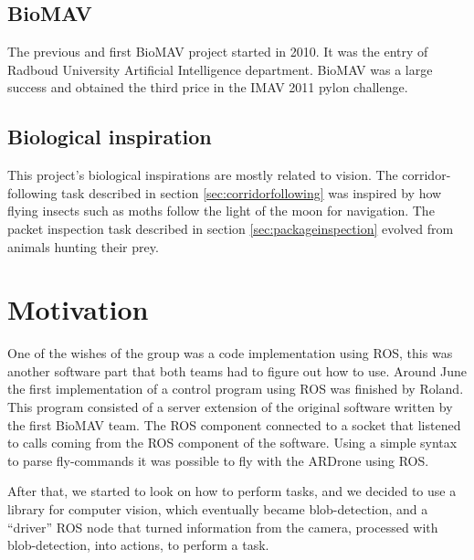 \documentclass[a4paper,10pt]{article}
\begin{document}
\subsection{BioMAV}
The previous and first BioMAV project started in 2010. It was the entry
of Radboud University Artificial Intelligence department. BioMAV was a large
success and obtained the third price in the IMAV 2011 pylon challenge.

\subsection{Biological inspiration}
This project's biological inspirations are mostly related to vision. The
corridor-following task described in section \ref{sec:corridorfollowing} was inspired by how flying insects such as moths
follow the light of the moon for navigation. The packet inspection task described in section \ref{sec:packageinspection}
evolved from animals hunting their prey.

\section{Motivation}
\label{sec:motivation}
One of the wishes of the group was a code implementation using ROS, this was another software part that both teams had to figure out how to use. 
Around June the first implementation of a control program using ROS was finished by Roland. 
This program consisted of a server extension of the original software written by the first BioMAV team.  
The ROS component connected to a socket that listened to calls coming from the ROS component of the software. 
Using a simple syntax to parse fly-commands it was possible to fly with the ARDrone using ROS.  

After that, we started to look on how to perform tasks, and we decided
to use a library for computer vision, which eventually became
blob-detection, and a ``driver'' ROS node that turned information from
the camera, processed with blob-detection, into actions, to perform a
task.




\end{document}

